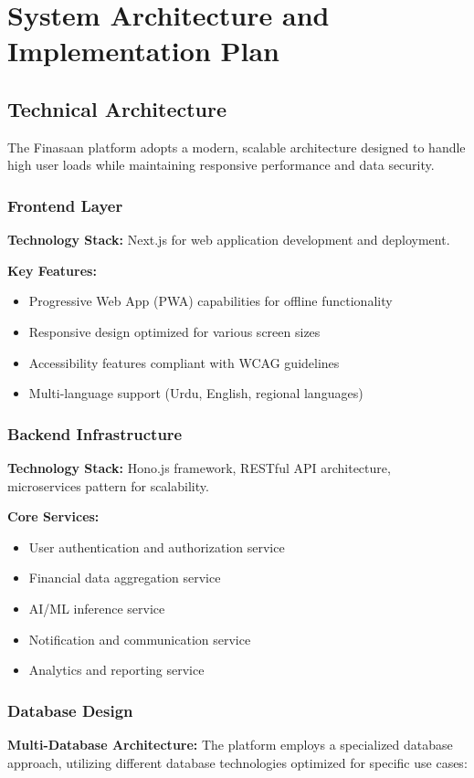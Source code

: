 \documentclass[12pt]{article}
\begin{document}
\section{System Architecture and Implementation Plan}
\subsection{Technical Architecture}

The Finasaan platform adopts a modern, scalable architecture designed to handle high user loads while maintaining responsive performance and data security.

\subsubsection{Frontend Layer}
\textbf{Technology Stack:} Next.js for web application development and deployment.

\textbf{Key Features:}
\begin{itemize}
    \item Progressive Web App (PWA) capabilities for offline functionality
    \item Responsive design optimized for various screen sizes
    \item Accessibility features compliant with WCAG guidelines
    \item Multi-language support (Urdu, English, regional languages)
\end{itemize}

\subsubsection{Backend Infrastructure}
\textbf{Technology Stack:} Hono.js framework, RESTful API architecture, microservices pattern for scalability.

\textbf{Core Services:}
\begin{itemize}
    \item User authentication and authorization service
    \item Financial data aggregation service
    \item AI/ML inference service
    \item Notification and communication service
    \item Analytics and reporting service
\end{itemize}

\subsubsection{Database Design}
\textbf{Multi-Database Architecture:} The platform employs a specialized database approach, utilizing different database technologies optimized for specific use cases:
\end{document}
